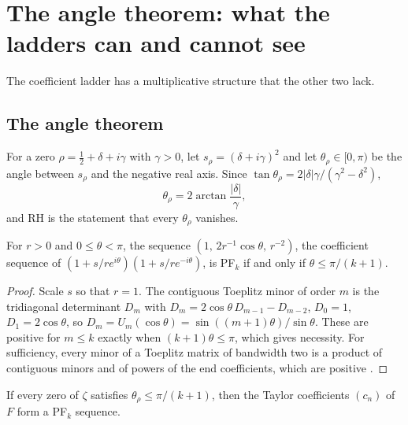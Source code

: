 \section{The angle theorem: what the ladders can and cannot see}\label{ht:sec:angle}

The coefficient ladder has a multiplicative structure that the other two lack.

\subsection{The angle theorem}

For a zero $\rho=\frac12+\delta+i\gamma$ with $\gamma>0$, let $s_\rho=(\delta+i\gamma)^2$ and let $\theta_\rho\in[0,\pi)$ be the angle between $s_\rho$ and the negative real axis. Since $\tan\theta_\rho=2|\delta|\gamma/(\gamma^2-\delta^2)$,
\begin{equation}\label{ht:eq:angle}
\theta_\rho=2\arctan\frac{|\delta|}{\gamma},
\end{equation}
and RH is the statement that every $\theta_\rho$ vanishes.

\begin{lemma}\label{ht:lem:three}
For $r>0$ and $0\le\theta<\pi$, the sequence $(1,\,2r^{-1}\cos\theta,\,r^{-2})$, the coefficient sequence of $(1+s/re^{i\theta})(1+s/re^{-i\theta})$, is PF$_k$ if and only if $\theta\le\pi/(k+1)$.
\end{lemma}

\begin{proof}
Scale $s$ so that $r=1$. The contiguous Toeplitz minor of order $m$ is the tridiagonal determinant $D_m$ with $D_m=2\cos\theta\,D_{m-1}-D_{m-2}$, $D_0=1$, $D_1=2\cos\theta$, so $D_m=U_m(\cos\theta)=\sin((m+1)\theta)/\sin\theta$. These are positive for $m\le k$ exactly when $(k+1)\theta\le\pi$, which gives necessity. For sufficiency, every minor of a Toeplitz matrix of bandwidth two is a product of contiguous minors and of powers of the end coefficients, which are positive \cite{Karlin68}. %
\end{proof}

\begin{theorem}\label{ht:thm:angle}
If every zero of $\zeta$ satisfies $\theta_\rho\le\pi/(k+1)$, then the Taylor coefficients $(c_n)$ of $F$ form a PF$_k$ sequence.
\end{theorem}

